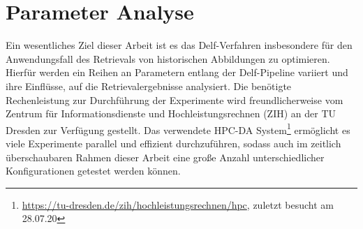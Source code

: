 \chapter{Parameter Analyse}

Ein wesentliches Ziel dieser Arbeit ist es das Delf-Verfahren insbesondere für den Anwendungsfall des Retrievals von historischen Abbildungen zu optimieren. Hierfür werden ein Reihen an Parametern entlang der Delf-Pipeline variiert und ihre Einflüsse, auf die Retrievalergebnisse analysiert.
Die benötigte Rechenleistung zur Durchführung der Experimente wird freundlicherweise vom 
Zentrum für Informationsdienste und Hochleistungsrechnen (ZIH) an der TU Dresden zur Verfügung gestellt. Das verwendete HPC-DA System\footnote{\url{https://tu-dresden.de/zih/hochleistungsrechnen/hpc}, zuletzt besucht am 28.07.20} ermöglicht es viele Experimente parallel und effizient durchzuführen, sodass auch im zeitlich überschaubaren Rahmen dieser Arbeit eine große Anzahl unterschiedlicher Konfigurationen getestet werden können.

